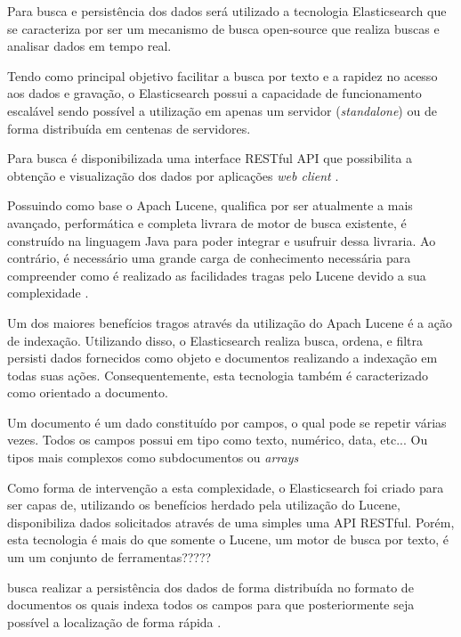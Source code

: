 Para busca e persistência dos dados será utilizado a tecnologia Elasticsearch que se caracteriza por ser um mecanismo de busca open-source que realiza buscas e analisar dados em tempo real.

Tendo como principal objetivo facilitar a busca por texto e a rapidez no acesso aos dados e gravação, o Elasticsearch possui a capacidade de funcionamento escalável sendo possível a utilização em apenas um servidor (\textit{standalone}) ou de forma distribuída em centenas de servidores.  

Para busca é disponibilizada uma interface RESTful API que possibilita a obtenção e visualização dos dados por aplicações \textit{web client} \cite{Gormley:2015}.

Possuindo como base o Apach Lucene, qualifica por ser atualmente a mais avançado, performática e completa livrara de motor de busca existente, é construído na linguagem Java para poder integrar e usufruir dessa livraria. Ao contrário, é necessário uma grande carga de conhecimento necessária para compreender como é realizado as facilidades tragas pelo Lucene devido a sua complexidade \cite{Gormley:2015}.

Um dos maiores benefícios tragos através da utilização do Apach Lucene é a ação de indexação. Utilizando disso, o Elasticsearch realiza busca, ordena, e filtra persisti dados fornecidos como objeto e documentos realizando a indexação em todas suas ações. Consequentemente, esta tecnologia também é caracterizado como orientado a documento.

Um documento é um dado constituído por campos, o qual pode se repetir várias vezes. Todos os campos possui em tipo como texto, numérico, data, etc... Ou tipos mais complexos como subdocumentos ou \textit{arrays}

Como forma de intervenção a esta complexidade, o Elasticsearch foi criado para  ser capas de, utilizando os benefícios herdado pela utilização do Lucene, disponibiliza dados solicitados através de uma simples uma API RESTful. Porém, esta tecnologia é mais do que somente o Lucene, um motor de busca por texto, é um um conjunto de ferramentas?????

busca realizar a persistência dos dados de forma distribuída no formato de documentos os quais indexa todos os campos para que posteriormente seja possível a localização de forma rápida \cite{Gormley:2015}. 
